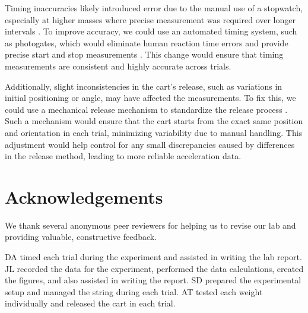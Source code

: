 ﻿\documentclass[reprint,amsmath,amssymb,prl]{revtex4-2}
\begin{document}
Timing inaccuracies likely introduced error due to the manual use of a stopwatch, especially at higher masses where precise measurement was required over longer intervals \cite{hetzler2008reliability}. To improve accuracy, we could use an automated timing system, such as photogates, which would eliminate human reaction time errors and provide precise start and stop measurements \cite{taylor1997introduction}. This change would ensure that timing measurements are consistent and highly accurate across trials. 

Additionally, slight inconsistencies in the cart’s release, such as variations in initial positioning or angle, may have affected the measurements. To fix this, we could use a mechanical release mechanism to standardize the release process \cite{taylor1997introduction}. Such a mechanism would ensure that the cart starts from the exact same position and orientation in each trial, minimizing variability due to manual handling. This adjustment would help control for any small discrepancies caused by differences in the release method, leading to more reliable acceleration data.





\section{Acknowledgements}
We thank several anonymous peer reviewers for helping us to revise our lab and providing valuable, constructive feedback. 

DA timed each trial during the experiment and assisted in writing the lab report. JL recorded the data for the experiment, performed the data calculations, created the figures, and also assisted in writing the report. SD prepared the experimental setup and managed the string during each trial. AT tested each weight individually and released the cart in each trial. 
\end{document}
